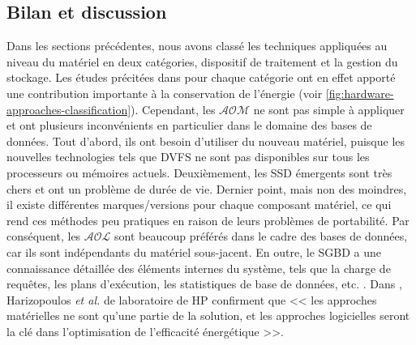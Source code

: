 \subsection{Bilan et discussion}\label{sec:bilanAOM}
Dans les sections précédentes, nous avons classé les techniques appliquées au niveau du matériel en deux catégories, dispositif de traitement et la gestion du stockage. Les études précitées dans pour chaque catégorie ont en effet apporté une contribution importante à la conservation de l'énergie (voir \ref{fig:hardware-approaches-classification}). Cependant, les $\mathcal{AOM}$ ne sont pas simple à appliquer et ont plusieurs inconvénients en particulier dans le domaine des bases de données. Tout d'abord, ils ont besoin d'utiliser du nouveau matériel, puisque les nouvelles technologies tels que DVFS ne sont pas disponibles sur tous les processeurs ou mémoires actuels. Deuxièmement, les SSD émergents sont très chers et ont un problème de durée de vie. Dernier point, mais non des moindres, il existe différentes marques/versions pour chaque composant matériel, ce qui rend ces méthodes peu pratiques en raison de leurs problèmes de portabilité.
Par conséquent, les $\mathcal{AOL}$ sont beaucoup préférés dans le cadre des bases de données, car ils sont indépendants du matériel sous-jacent. En outre, le SGBD a une connaissance détaillée des éléments internes du système, tels que la charge de requêtes, les plans d'exécution, les statistiques de base de données, etc. \cite{Korkmaz15}. Dans \cite{Harizopoulos09}, Harizopoulos \textit{et al.} de laboratoire de HP confirment que << les approches matérielles ne sont qu'une partie de la solution, et les approches logicielles seront la clé dans l'optimisation de l'efficacité énergétique >>.

